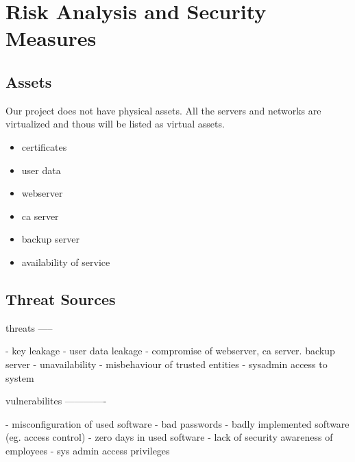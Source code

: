 \documentclass[english]{article}
\begin{document}
%


\section{Risk Analysis and Security Measures}

\subsection{Assets}


Our project does not have physical assets. All the servers and networks are virtualized and thous will be listed as virtual assets.

\begin{itemize}
	\item certificates
	\item user data
	\item webserver
	\item ca server
	\item backup server
	\item availability of service
\end{itemize}

\subsection{Threat Sources}

threats
-----

- key leakage
- user data leakage
- compromise of webserver, ca server. backup server
- unavailability
- misbehaviour of trusted entities
- sysadmin access to system

vulnerabilites
-------------

- misconfiguration of used software
- bad passwords
- badly implemented software (eg. access control)
- zero days in used software
- lack of security awareness of employees
- sys admin access privileges


\end{document}
